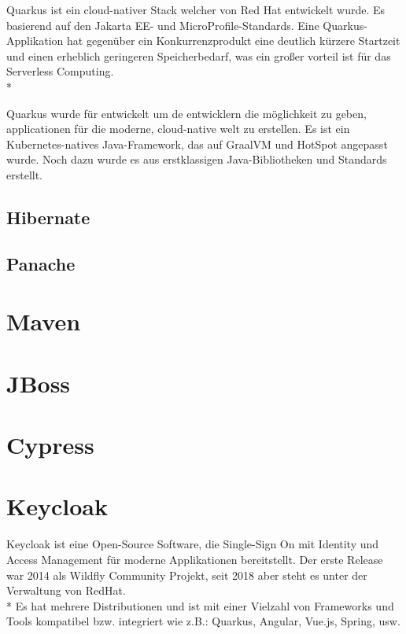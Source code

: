 Quarkus ist ein cloud-nativer Stack welcher von Red Hat entwickelt wurde. Es basierend auf den Jakarta EE- und MicroProfile-Standards. 
Eine Quarkus-Applikation hat gegenüber ein Konkurrenzprodukt eine deutlich kürzere Startzeit und einen erheblich geringeren Speicherbedarf, was ein großer vorteil ist für das Serverless Computing.  \cite{Quarkus} \\*

Quarkus wurde für entwickelt um de entwicklern die möglichkeit zu geben, applicationen für die moderne, cloud-native welt zu erstellen. 
Es ist ein Kubernetes-natives Java-Framework, das auf GraalVM und HotSpot angepasst wurde. Noch dazu wurde es aus erstklassigen Java-Bibliotheken und Standards erstellt.

\subsection{Hibernate}

\subsection{Panache}

\section{Maven}

\section{JBoss}

\section{Cypress}

\section{Keycloak}
\author{Benjamin Besic}
Keycloak ist eine Open-Source Software, die Single-Sign On mit Identity und Access Management für moderne Applikationen bereitstellt. Der erste Release war 2014 als Wildfly Community Projekt, seit 2018 aber steht es unter der Verwaltung von RedHat. \cite{KeycloakWiki}  \\* 
Es hat mehrere Distributionen und ist mit einer Vielzahl von Frameworks und Tools kompatibel bzw. integriert wie z.B.: Quarkus, Angular, Vue.js, Spring, usw. \cite{KeyCloakDZone}

